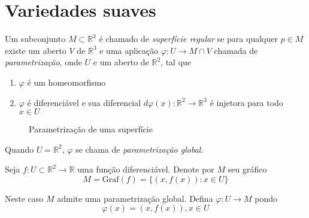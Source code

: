 \section{Variedades suaves}

\begin{defi}
Um subconjunto $M \subset \mathbb{R}^3$ é chamado de \emph{superfície regular} se para qualquer $p \in M$ existe um aberto $V$ de $\mathbb{R}^3$ e uma aplicação $\varphi: U \rightarrow M \cap V$ chamada de \emph{parametrização}, onde $U$ e um aberto de $\mathbb{R}^2$, tal que
\begin{enumerate}
    \item $\varphi$ é um homeomorfismo
    \item $\varphi$ é diferenciável e sua diferencial $d\varphi(x): \mathbb{R}^2 \rightarrow \mathbb{R}^3$ é injetora para todo $x \in U$
\end{enumerate}
\end{defi}

\begin{figure}
	\centering
	
	\caption{Parametrização de uma superfície}
\end{figure}

\begin{obse}
	Quando $U = \mathbb{R}^2$, $\varphi$ se chama de \emph{parametrização global}.
\end{obse}

\begin{exemplo}
Seja $f: U \subset \mathbb{R}^2 \rightarrow \mathbb{R}$ uma função diferenciável. Denote por $M$ seu gráfico
\begin{equation*}
    M = \text{Graf}(f) = \{ (x,f(x)): x \in U \}
\end{equation*}

Neste caso $M$ admite uma parametrização global. Defina $\varphi: U \rightarrow M$ pondo
\begin{equation*}
    \varphi(x) = (x,f(x)), x \in U
\end{equation*}
\end{exemplo}

